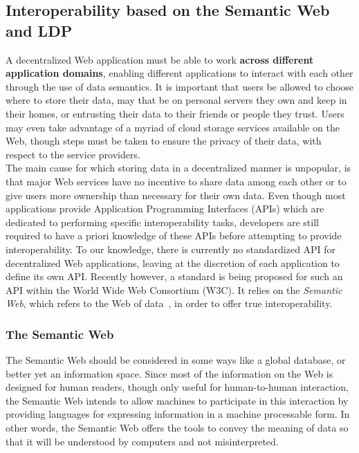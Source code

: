 \subsection{Interoperability based on the Semantic Web and LDP}
\label{sec:semweb}
A decentralized Web application must be able to work \textbf{across different application domains}, enabling different applications to interact with each other through the use of data semantics. It is important that users be allowed to choose where to store their data, may that be on personal servers they own and keep in their homes, or entrusting their data to their friends or people they trust. Users may even take advantage of a myriad of cloud storage services available on the Web, though steps must be taken to ensure the privacy of their data, with respect to the service providers.\\

The main cause for which storing data in a decentralized manner is unpopular, is that major Web services have no incentive to share data among each other or to give users more ownership than necessary for their own data. Even though most applications provide Application Programming Interfaces (APIs) which are dedicated to performing specific interoperability tasks, developers are still required to have a priori knowledge of these APIs before attempting to provide interoperability. To our knowledge, there is currently no standardized API for decentralized Web applications, leaving at the discretion of each application to define its own API. Recently however, a standard is being proposed for such an API within the World Wide Web Consortium (W3C). It relies on the \textit{Semantic Web}, which refers to the Web of data~\cite{berners1999weaving}, in order to offer true interoperability.

\subsubsection{The Semantic Web}
The Semantic Web should be considered in some ways like a global database, or better yet an information space. Since most of the information on the Web is designed for human readers, though only useful for human-to-human interaction, the Semantic Web intends to allow machines to participate in this interaction by providing languages for expressing information in a machine processable form. In other words, the Semantic Web offers the tools to convey the meaning of data so that it will be understood by computers and not misinterpreted.\\

